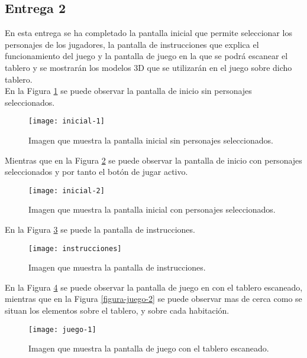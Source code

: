 \begin{itemize}
\section{Entrega 2}
En esta entrega se ha completado la pantalla inicial que permite seleccionar los personajes de los jugadores, la pantalla de instrucciones que explica el funcionamiento del juego y la pantalla de juego en la que se podrá escanear el tablero y se mostrarán los modelos 3D que se utilizarán en el juego sobre dicho tablero.\\

En la Figura \ref{figura-inicial-1} se puede observar la pantalla de inicio sin personajes seleccionados.

\begin{figure}[h]
  \centering
  \texttt{[image: inicial-1]}
  \caption{Imagen que muestra la pantalla inicial sin personajes seleccionados.}
  \label{figura-inicial-1}
\end{figure}

Mientras que en la Figura \ref{figura-inicial-2} se puede observar la pantalla de inicio con personajes seleccionados y por tanto el botón de jugar activo.

\begin{figure}[h]
  \centering
  \texttt{[image: inicial-2]}
  \caption{Imagen que muestra la pantalla inicial con personajes seleccionados.}
  \label{figura-inicial-2}
\end{figure}

\newpage

En la Figura \ref{figura-instrucciones} se puede la pantalla de instrucciones.

\begin{figure}[h]
  \centering
  \texttt{[image: instrucciones]}
  \caption{Imagen que muestra la pantalla de instrucciones.}
  \label{figura-instrucciones}
\end{figure}


En la Figura \ref{figura-juego-1} se puede observar la pantalla de juego en con el tablero escaneado, mientras que en la Figura \ref{figura-juego-2} se puede observar mas de cerca como se situan los elementos sobre el tablero, y sobre cada habitación.

\begin{figure}[h]
  \centering
  \texttt{[image: juego-1]}
  \caption{Imagen que muestra la pantalla de juego con el tablero escaneado.}
  \label{figura-juego-1}
\end{figure}


\end{itemize}
